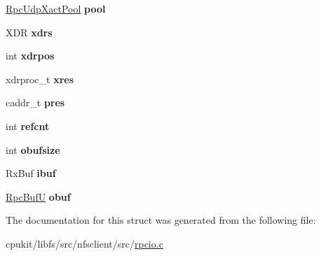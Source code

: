 \begin{DoxyCompactItemize}
\mbox{\hyperlink{structRpcUdpXactPoolRec__}{Rpc\+Udp\+Xact\+Pool}} {\bfseries pool}
\item 
\mbox{\label{structRpcUdpXactRec___ac87ee2d1a08166017cfc8c416d4feedd}} 
X\+DR {\bfseries xdrs}
\item 
\mbox{\label{structRpcUdpXactRec___a8776b83e0be27afd5a84b8b430057028}} 
int {\bfseries xdrpos}
\item 
\mbox{\label{structRpcUdpXactRec___ad2584f2a19ee8af69953dc8bd8e0a0c9}} 
xdrproc\+\_\+t {\bfseries xres}
\item 
\mbox{\label{structRpcUdpXactRec___aac8f5e6a5ecb26c0216134dda5695807}} 
caddr\+\_\+t {\bfseries pres}
\item 
\mbox{\label{structRpcUdpXactRec___af1054c54d7fe28b673cdd09f1d35c4f5}} 
int {\bfseries refcnt}
\item 
\mbox{\label{structRpcUdpXactRec___a77699717581fcbe7349a2d8949e8a40a}} 
int {\bfseries obufsize}
\item 
\mbox{\label{structRpcUdpXactRec___a520595ffc5260173a6052e42f453fa92}} 
Rx\+Buf {\bfseries ibuf}
\item 
\mbox{\label{structRpcUdpXactRec___ae3d012408a86e2c5d722d562fdaae6de}} 
\mbox{\hyperlink{unionRpcBufU__}{Rpc\+BufU}} {\bfseries obuf}
\end{DoxyCompactItemize}


The documentation for this struct was generated from the following file\+:\begin{DoxyCompactItemize}
\item 
cpukit/libfs/src/nfsclient/src/\mbox{\hyperlink{rpcio_8c}{rpcio.\+c}}\end{DoxyCompactItemize}
